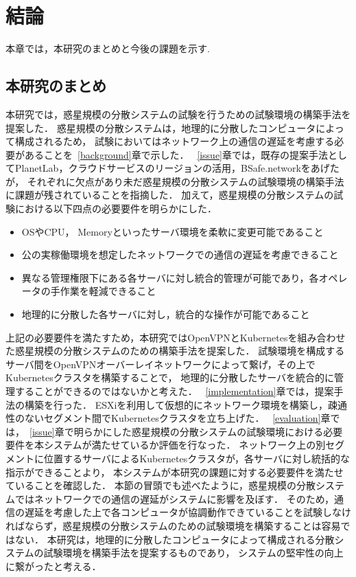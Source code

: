 \chapter{結論}
\label{conclusion}

本章では，本研究のまとめと今後の課題を示す.

\section{本研究のまとめ}
\label{conclusion:conclusion}

本研究では，惑星規模の分散システムの試験を行うための試験環境の構築手法を提案した．
惑星規模の分散システムは，地理的に分散したコンピュータによって構成されるため，
試験においてはネットワーク上の通信の遅延を考慮する必要があることを~\ref{background}章で示した．
~\ref{issue}章では，既存の提案手法としてPlanetLab，クラウドサービスのリージョンの活用，BSafe.networkをあげたが，
それぞれに欠点があり未だ惑星規模の分散システムの試験環境の構築手法に課題が残されていることを指摘した．
加えて，惑星規模の分散システムの試験における以下四点の必要要件を明らかにした．
\begin{itemize}
  \item OSやCPU， Memoryといったサーバ環境を柔軟に変更可能であること
  \item 公の実稼働環境を想定したネットワークでの通信の遅延を考慮できること
  \item 異なる管理権限下にある各サーバに対し統合的管理が可能であり，各オペレータの手作業を軽減できること
  \item 地理的に分散した各サーバに対し，統合的な操作が可能であること
\end{itemize}
上記の必要要件を満たすため，本研究ではOpenVPNとKubernetesを組み合わせた惑星規模の分散システムのための構築手法を提案した．
試験環境を構成するサーバ間をOpenVPNオーバーレイネットワークによって繋げ，その上でKubernetesクラスタを構築することで，
地理的に分散したサーバを統合的に管理することができるのではないかと考えた．
~\ref{implementation}章では，提案手法の構築を行った．
ESXiを利用して仮想的にネットワーク環境を構築し，疎通性のないセグメント間でKubernetesクラスタを立ち上げた．
~\ref{evaluation}章では，~\ref{issue}章で明らかにした惑星規模の分散システムの試験環境における必要要件を本システムが満たせているか評価を行なった．
ネットワーク上の別セグメントに位置するサーバによるKubernetesクラスタが，各サーバに対し統括的な指示ができることより，
本システムが本研究の課題に対する必要要件を満たせていることを確認した．
本節の冒頭でも述べたように，惑星規模の分散システムではネットワークでの通信の遅延がシステムに影響を及ぼす．
そのため，通信の遅延を考慮した上で各コンピュータが協調動作できていることを試験しなければならず，惑星規模の分散システムのための試験環境を構築することは容易ではない．
本研究は，地理的に分散したコンピュータによって構成される分散システムの試験環境を構築手法を提案するものであり，
システムの堅牢性の向上に繋がったと考える．

